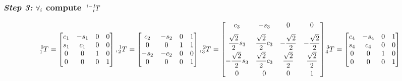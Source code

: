 \documentclass[10pt]{article}
\begin{document}
\subsubsection*{\textit{\textbf{Step 3: }}$\bf{\it{\forall_{i}}}$ compute $\bf{\it{ \tensor*[^{i-1}_{i}]{T}{}}}$}
\[
\tensor*[^{0}_{1}]{T}{} =
\begin{bmatrix}
    c_{1}        & -s_{1}       & 0     & 0      \\
    s_{1}        & c_{1}        & 0     & 0      \\
    0            & 0            & 1     & 0      \\
    0            & 0            & 0     & 1
\end{bmatrix}, 
\tensor*[^{1}_{2}]{T}{} =
\begin{bmatrix}
    c_{2}        & -s_{2}       & 0     & 1      \\
    0            & 0            & 1     & 1      \\
    -s_{2}       & -c_{2}       & 0     & 0      \\
    0            & 0            & 0     & 1
\end{bmatrix}, 
\tensor*[^{2}_{3}]{T}{} =
\begin{bmatrix}
    c_{3}                            & -s_{3}                           & 0                       & 0  \\[6pt]
    \dfrac{\sqrt{2}}{2} s_{3}        & \dfrac{\sqrt{2}}{2} c_{3}        & -\dfrac{\sqrt{2}}{2}    & -\dfrac{\sqrt{2}}{2}      
    \\[6pt]
    -\dfrac{\sqrt{2}}{2} s_{3}       & \dfrac{\sqrt{2}}{2} c_{3}        & \dfrac{\sqrt{2}}{2}     & \dfrac{\sqrt{2}}{2}       
    \\[6pt]
    0                                & 0                                & 0                       & 1
\end{bmatrix}
\tensor*[^{3}_{4}]{T}{} =
\begin{bmatrix}
    c_{4}        & -s_{4}       & 0     & 1      \\
    s_{4}        & c_{4}        & 0     & 0      \\
    0            & 0            & 1     & 0      \\
    0            & 0            & 0     & 1
\end{bmatrix}\] \\
\end{document}
